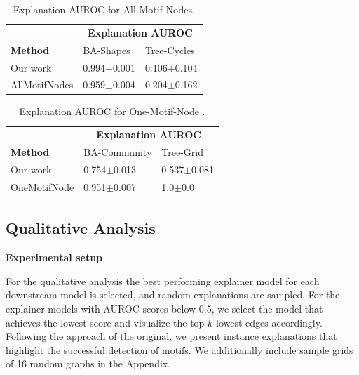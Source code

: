 \begin{table}[ht]
    \centering
    \scriptsize
    \begin{tabularx}{0.6\textwidth}{l*{2}{X}}   %
    \toprule
    \textbf{} & \multicolumn{2}{c}{\textbf{Explanation AUROC}} \\
    \cmidrule{2-3}
    \textbf{Method} & BA-Shapes & Tree-Cycles \\
    \midrule
    Our work & 0.994$\pm$0.001 & 0.106$\pm$0.104 \\
    \midrule
    AllMotifNodes & 0.959$\pm$0.004 & 0.204$\pm$0.162 \\
    \bottomrule
    \end{tabularx}
    \caption[Inductive performance using all motif nodes for training]{Explanation AUROC for All-Motif-Nodes.}
    \label{tab:allmotifnodes_selected}
\end{table}

\begin{table}[ht]
    \centering
    \scriptsize
    \begin{tabularx}{0.6\textwidth}{l*{2}{X}}   %
    \toprule
    \textbf{} & \multicolumn{2}{c}{\textbf{Explanation AUROC}} \\
    \cmidrule{2-3}
    \textbf{Method} & BA-Community & Tree-Grid \\
    \midrule
    Our work & 0.754$\pm$0.013 & 0.537$\pm$0.081 \\
    \midrule
    OneMotifNode & 0.951$\pm$0.007 & 1.0$\pm$0.0 \\
    \bottomrule
    \end{tabularx}
    \caption[Inductive performance using one motif node for training]{Explanation AUROC for One-Motif-Node .}
    \label{tab:onemotifnode_selected}
\end{table}


\subsection{Qualitative Analysis}
\label{sec:qual_exp}

\textbf{Experimental setup}\par
For the qualitative analysis the best performing explainer model for each downstream model is selected, and random explanations are sampled. For the explainer models with AUROC scores below 0.5, we select the model that achieves the lowest score and visualize the top-$k$ lowest edges accordingly. Following the approach of the original, we present instance explanations that highlight the successful detection of motifs. We additionally include sample grids of 16 random graphs in the Appendix.


